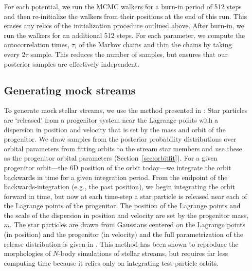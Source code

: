 For each potential, we run the MCMC walkers for a burn-in period of 512 steps
and then re-initialize the walkers from their positions at the end of this run.
This erases any relics of the initialization procedure outlined above. After
burn-in, we run the walkers for an additional 512 steps. For each parameter, we
compute the autocorrelation times, $\tau$, of the Markov chains and thin the
chains by taking every $2\tau$ sample. This reduces the number of samples, but
ensures that our posterior samples are effectively independent.

\subsection{Generating mock streams}\label{sec:mocks}

To generate mock stellar streams, we use the method presented in
\citet{fardal14}: Star particles are `released' from a progenitor system near
the Lagrange points with a dispersion in position and velocity that is set by
the mass and orbit of the progenitor. We draw samples from the posterior
probability distributions over orbital parameters from fitting orbits to the
stream star members and use these as the progenitor orbital parameters
(Section~\ref{sec:orbitfit}). For a given progenitor orbit---the 6D position of
the orbit today---we integrate the orbit backwards in time for a given
integration period. From the endpoint of the backwards-integration (e.g., the
past position), we begin integrating the orbit forward in time, but now at each
time-step a star particle is released near each of the Lagrange points of the
progenitor. The position of the Lagrange points and the scale of the dispersion
in position and velocity are set by the progenitor mass, $m$. The star particles
are drawn from Gaussians centered on the Lagrange points (in position) and the
progenitor (in velocity) and the full parametrization of the release
distribution is given in \cite{fardal14}. This method has been shown to
reproduce the morphologies of $N$-body simulations of stellar streams, but
requires far less computing time because it relies only on integrating
test-particle orbits.

